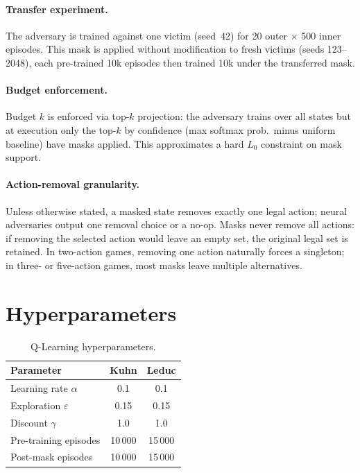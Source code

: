 \documentclass{article}
\begin{document}
\paragraph{Transfer experiment.}
The adversary is trained against one victim (seed~42) for 20 outer $\times$ 500 inner episodes. This mask is applied without modification to fresh victims (seeds 123--2048), each pre-trained 10k episodes then trained 10k under the transferred mask.

\paragraph{Budget enforcement.}
Budget $k$ is enforced via top-$k$ projection: the adversary trains over all states but at execution only the top-$k$ by confidence (max softmax prob.\ minus uniform baseline) have masks applied. This approximates a hard $L_0$ constraint on mask support.

\paragraph{Action-removal granularity.}
Unless otherwise stated, a masked state removes exactly one legal action; neural adversaries output one removal choice or a no-op. Masks never remove all actions: if removing the selected action would leave an empty set, the original legal set is retained. In two-action games, removing one action naturally forces a singleton; in three- or five-action games, most masks leave multiple alternatives.

\section{Hyperparameters}
\label{app:hyperparams}

\begin{table}[ht]
\centering
\caption{Q-Learning hyperparameters.}
\begin{tabular}{lcc}
\toprule
Parameter & Kuhn & Leduc \\
\midrule
Learning rate $\alpha$ & 0.1 & 0.1 \\
Exploration $\varepsilon$ & 0.15 & 0.15 \\
Discount $\gamma$ & 1.0 & 1.0 \\
Pre-training episodes & 10\,000 & 15\,000 \\
Post-mask episodes & 10\,000 & 15\,000 \\
\bottomrule
\end{tabular}
\end{table}
\end{document}
